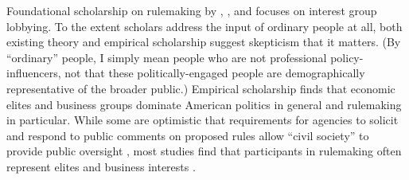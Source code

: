Foundational scholarship on rulemaking by \citet{Furlong2004}, \citet{Furlong1997, Furlong1998}, and \citet{Kerwin2011} focuses on interest group lobbying. To the extent scholars address the input of ordinary people %
at all, both existing theory and empirical scholarship suggest skepticism that it matters. (By ``ordinary'' people, I simply mean people who are not professional policy-influencers, not that these politically-engaged people are demographically representative of the broader public.)
Empirical scholarship finds that economic elites and business groups dominate American politics in general \citep{Gilens2014} and rulemaking in particular. %
While some are optimistic that requirements for agencies to solicit and respond to public comments on proposed rules allow ``civil society'' to provide public oversight \citep{Michaels2015, Metzger2010}, most studies find that participants in rulemaking often represent elites and business interests \citep{Seifter2016UCLA, Crow2015, Wagner2011, West2009, Yackee2006JOP, Yackee2006JPART, Golden1998, Haeder2015, Cook2017}.%

